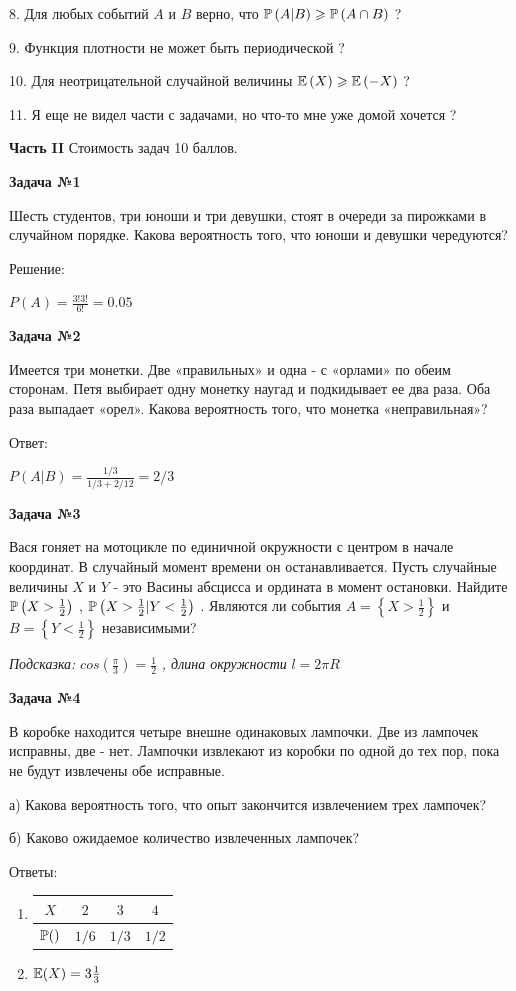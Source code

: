 \documentclass[12pt, a4paper]{article}\usepackage[]{graphicx}\usepackage[]{color}
\begin{document}
8. Для любых событий  $A$  и  $B$  верно, что  $\P\left(A|B\right)\ge \P\left(A\cap B\right)$  ?

9. Функция плотности не может быть периодической ?

10. Для неотрицательной случайной величины  $\E\left(X\right)\ge \E\left(-X\right)$  ?

11. Я еще не видел части с задачами, но что-то мне уже домой хочется ?


{\bf Часть }{\bf II} Стоимость задач 10 баллов.

{\bf Задача №1}

Шесть студентов, три юноши и три девушки, стоят в очереди за пирожками в случайном порядке. Какова вероятность того, что юноши и девушки чередуются?

Решение:

$P(A)=\frac{3!3!}{6!}=0.05$

{\bf Задача №2}

Имеется три монетки. Две «правильных» и одна - с «орлами» по обеим сторонам. Петя выбирает одну монетку наугад и подкидывает ее два раза. Оба раза выпадает «орел». Какова вероятность того, что монетка «неправильная»?

Ответ:

$P(A|B)=\frac{1/3}{1/3+2/12}=2/3$

{\bf Задача №3}

Вася гоняет на мотоцикле по единичной окружности с центром в начале координат. В случайный момент времени он останавливается. Пусть случайные величины  $X$  и  $Y$  - это Васины абсцисса и ордината в момент остановки. Найдите  $\P\left(X>\frac{1}{2} \right)$ ,  $\P\left(X>\frac{1}{2} |Y<\frac{1}{2} \right)$ . Являются ли события  $A=\left\{X>\frac{1}{2} \right\}$  и  $B=\left\{Y<\frac{1}{2} \right\}$  независимыми?

{\it Подсказка: } $cos\left(\frac{\pi }{3} \right)=\frac{1}{2} $ {\it , длина окружности } $l=2\pi R$

{\bf Задача №4}

В коробке находится четыре внешне одинаковых лампочки. Две из лампочек исправны, две - нет. Лампочки извлекают из коробки по одной до тех пор, пока не будут извлечены обе исправные.

а)	Какова вероятность того, что опыт закончится извлечением трех лампочек?

б)	Каково ожидаемое количество извлеченных лампочек?

Ответы:
\begin{enumerate}
\item
\begin{tabular}{c|ccc}
$X$ & $2$ & $3$ & $4$ \\
\hline
$\P()$ & $1/6$ & $1/3$ & $1/2$ \\
\end{tabular}
\item $\E(X)=3\frac{1}{3}$
\end{enumerate}
\end{document}
